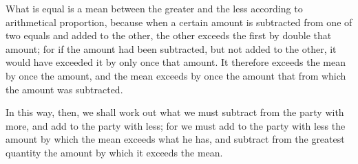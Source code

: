                 What is equal is a mean between the greater and the less according to arithmetical proportion, because when a certain amount is subtracted from one of two equals and added to the other, the other exceeds the first by double that amount; for if the amount had been subtracted, but not added to the other, it would have exceeded it by only once that amount. It therefore exceeds the mean by once the amount, and the mean exceeds by once the amount that from which the amount was subtracted.

                In this way, then, we shall work out what we must subtract from the party with more, and add to the party with less; for we must add to the party with less the amount by which the mean exceeds what he has, and subtract from the greatest quantity the amount by which it exceeds the mean.


